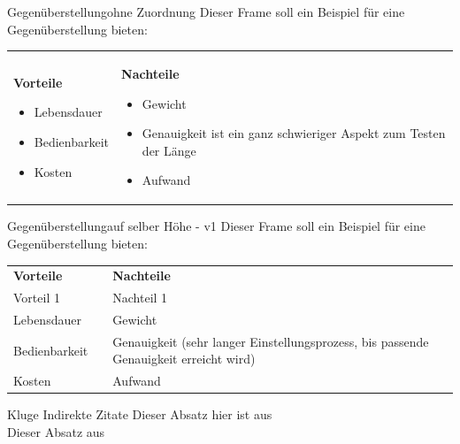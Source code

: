 \documentclass[
	12pt, 				%
	t,					%
	aspectratio=169,	%
	]{beamer}
\begin{document}
	
	\begin{frame}{Gegenüberstellung}{ohne Zuordnung}
		Dieser Frame soll ein Beispiel für eine Gegenüberstellung bieten:
		\begin{center}
		\begin{tabularx}{0.8\textwidth}{X|X}
			\textbf{Vorteile}
			 \begin{itemize}[<2->]
			 	\item Lebensdauer
			 	\item Bedienbarkeit
			 	\item Kosten
			 \end{itemize} &
			\textbf{Nachteile}
			 \begin{itemize}[<3->]
			 	\item Gewicht
			 	\item Genauigkeit ist ein ganz schwieriger Aspekt zum Testen der Länge
			 	\item Aufwand
			 \end{itemize}	 
			 \\
		\end{tabularx}
		\end{center}
	\end{frame}
	
	
	\begin{frame}{Gegenüberstellung}{auf selber Höhe - v1}
		Dieser Frame soll ein Beispiel für eine Gegenüberstellung bieten:
		\begin{center}
		\begin{tabularx}{\textwidth}{XcX}
			\textbf{Vorteile} & & \textbf{Nachteile}\\
			 Vorteil 1& \drawopp & Nachteil 1\\
			 Lebensdauer & \drawopp & Gewicht \\
			Bedienbarkeit & \drawopp & Genauigkeit (sehr langer Einstellungsprozess, bis passende Genauigkeit erreicht wird)\\
			Kosten & \drawopp & Aufwand \\
		\end{tabularx}
		\end{center}
	\end{frame}	
	
	
	\begin{frame}{Kluge Indirekte Zitate}
		Dieser Absatz hier ist aus \cite{art:swengineering2}\\
		Dieser Absatz aus \cite{art:swengineering3}
	\end{frame}
	
	
	
\end{document}
